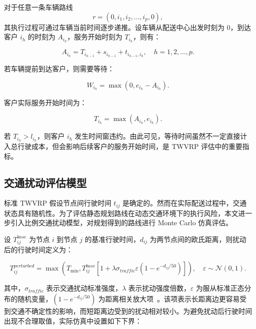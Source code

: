 \documentclass[12pt,a4paper,UTF8]{article}
\begin{document}
对于任意一条车辆路线
\[
r=(0,i_1,i_2,\dots,i_p,0),
\]
其执行过程可通过车辆当前时间逐步递推。设车辆从配送中心出发时刻为 $0$，到达客户 $i_h$ 的时刻为 $A_{i_h}$，服务开始时刻为 $T_{i_h}$，则有：

\begin{equation}
    A_{i_h}=T_{i_{h-1}}+s_{i_{h-1}}+t_{i_{h-1},i_h},
    \quad h=1,2,\dots,p.
    \label{eq:arrival_time}
\end{equation}

若车辆提前到达客户，则需要等待：

\begin{equation}
    W_{i_h}=\max(0,e_{i_h}-A_{i_h}).
    \label{eq:waiting_time}
\end{equation}

客户实际服务开始时间为：

\begin{equation}
    T_{i_h}=\max(A_{i_h},e_{i_h}).
    \label{eq:service_start_time}
\end{equation}

若 $T_{i_h}>l_{i_h}$，则客户 $i_h$ 发生时间窗违约。由此可见，等待时间虽然不一定直接计入总行驶成本，但会影响后续客户的服务开始时间，是 TWVRP 评估中的重要指标。

\subsection{交通扰动评估模型}

标准 TWVRP 假设节点间行驶时间 $t_{ij}$ 是确定的。然而在实际配送过程中，交通状态具有随机性。为了评估静态规划路线在动态交通环境下的执行风险，本文进一步引入比例交通扰动模型，对规划得到的路线进行 Monte Carlo 仿真评估。

设 $T^{base}_{ij}$ 为节点 $i$ 到节点 $j$ 的基准行驶时间，$d_{ij}$ 为两节点间的欧氏距离，则扰动后的行驶时间定义为：

\begin{equation}
    T^{perturbed}_{ij}
    =
    \max\left(
        T_{\min},
        T^{base}_{ij}
        \left[
            1+
            \lambda\sigma_{traffic}\varepsilon
            \left(1-e^{-d_{ij}/50}\right)
        \right]
    \right),
    \quad
    \varepsilon \sim \mathcal{N}(0,1).
    \label{eq:traffic_perturbation}
\end{equation}

其中，$\sigma_{traffic}$ 表示交通扰动标准强度，$\lambda$ 表示扰动强度倍数，$\varepsilon$ 为服从标准正态分布的随机变量，$\left(1-e^{-d_{ij}/50}\right)$ 为距离相关放大项~\cite{heakl2025svrpbench}。该项表示长距离边更容易受到交通不确定性的影响，而短距离边受到的扰动相对较小。为避免扰动后行驶时间出现不合理取值，实际仿真中设置如下下界：
\end{document}

